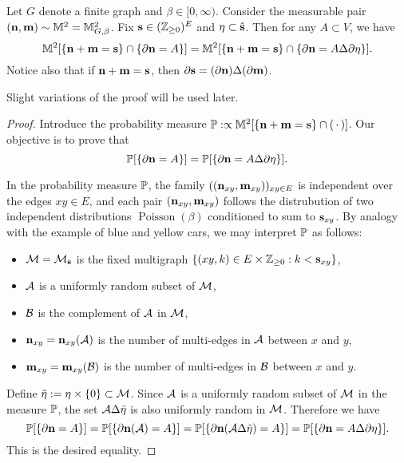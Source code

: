 \begin{lemma}
    \label{lem:explicit_switching_lemma}
    Let $G$ denote a finite graph and $\beta\in[0,\infty)$.
    Consider the measurable pair $(\n,\m)\sim \M^2=\M_{G,\beta}^2$.
    Fix $\s\in(\Z_{\geq 0})^E$ and $\eta\subset\hat\s$.
    Then for any $A\subset V$,
    we have
    \[
        \M^2[\{\n+\m=\s\}\cap\{\partial\n=A\}]
        =
        \M^2[\{\n+\m=\s\}\cap\{\partial\n=A\Delta\partial\eta\}].
    \]
    Notice also that if $\n+\m=\s$, then $\partial\s=(\partial\n)\Delta(\partial\m)$.
\end{lemma}

Slight variations of the proof will be used later.

\begin{proof}
    Introduce the probability measure $\P:\propto\M^2[\{\n+\m=\s\}\cap(\blank)]$.
    Our objective is to prove that
    \[
        \P[\{\partial\n=A\}]
        =
        \P[\{\partial\n=A\Delta\partial\eta\}].
    \]

    In the probability measure $\P$, the family $((\n_{xy},\m_{xy}))_{xy\in E}$
    is independent over the edges $xy\in E$,
    and each pair $(\n_{xy},\m_{xy})$ follows the distrubution of two independent 
    distributions $\operatorname{Poisson}(\beta)$ conditioned to sum to $\s_{xy}$.
    By analogy with the example of blue and yellow cars,
    we may interpret $\P$ as follows:
    \begin{itemize}
        \item $\calM=\calM_\s$ is the fixed multigraph $\{(xy,k)\in E\times\Z_{\geq 0}:k<\s_{xy}\}$,
        \item $\calA$ is a uniformly random subset of $\calM$,
        \item $\calB$ is the complement of $\calA$ in $\calM$,
        \item $\n_{xy}=\n_{xy}(\calA)$ is the number of multi-edges in $\calA$ between $x$ and $y$,
        \item $\m_{xy}=\m_{xy}(\calB)$ is the number of multi-edges in $\calB$ between $x$ and $y$.
    \end{itemize}

    Define $\tilde\eta:=\eta\times\{0\}\subset\calM$.
    Since $\calA$ is a uniformly random subset of $\calM$ in the measure $\P$,
    the set $\calA\Delta\tilde\eta$ is also uniformly random in $\calM$.
    Therefore we have
    \[
        \P[\{\partial\n=A\}]=
        \P[\{\partial\n(\calA)=A\}]
        =
        \P[\{\partial\n(\calA\Delta\tilde\eta)=A\}]
        =
        \P[\{\partial\n=A\Delta\partial\eta\}].
    \]
    This is the desired equality.
\end{proof}

